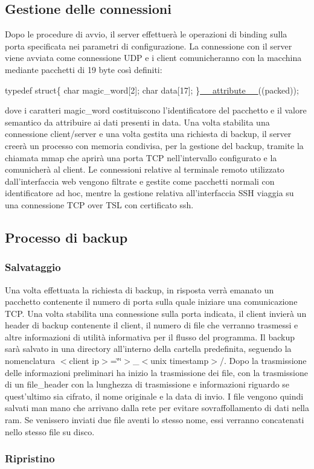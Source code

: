 \subsection*{Gestione delle connessioni}

Dopo le procedure di avvio, il server effettuerà le operazioni di binding sulla porta specificata nei parametri di configurazione. La connessione con il server viene avviata come connessione U\+DP e i client comunicheranno con la macchina mediante pacchetti di 19 byte così definiti\+:


\begin{DoxyCode}
\textcolor{keyword}{typedef} \textcolor{keyword}{struct}\{
\textcolor{keywordtype}{char} magic\_word[2];
\textcolor{keywordtype}{char} data[17];
\}\hyperlink{struct____attribute____}{\_\_attribute\_\_}((packed));
\end{DoxyCode}


dove i caratteri magic\+\_\+word costituiscono l’identificatore del pacchetto e il valore semantico da attribuire ai dati presenti in data. Una volta stabilita una connessione client/server e una volta gestita una richiesta di backup, il server creerà un processo con memoria condivisa, per la gestione del backup, tramite la chiamata mmap che aprirà una porta T\+CP nell’intervallo configurato e la comunicherà al client. Le connessioni relative al terminale remoto utilizzato dall’interfaccia web vengono filtrate e gestite come pacchetti normali con identificatore ad hoc, mentre la gestione relativa all’interfaccia S\+SH viaggia su una connessione T\+CP over T\+SL con certificato ssh. \subsection*{Processo di backup}

\subsubsection*{Salvataggio}

Una volta effettuata la richiesta di backup, in risposta verrà emanato un pacchetto contenente il numero di porta sulla quale iniziare una comunicazione T\+CP. Una volta stabilita una connessione sulla porta indicata, il client invierà un header di backup contenente il client, il numero di file che verranno trasmessi e altre informazioni di utilità informativa per il flusso del programma. Il backup sarà salvato in una directory all’interno della cartella predefinita, seguendo la nomenclatura $<$client ip$>$=\char`\"{}\char`\"{}$>$\+\_\+$<$unix timestamp$>$/. Dopo la trasmissione delle informazioni preliminari ha inizio la trasmissione dei file, con la trasmissione di un file\+\_\+header con la lunghezza di trasmissione e informazioni riguardo se quest’ultimo sia cifrato, il nome originale e la data di invio. I file vengono quindi salvati man mano che arrivano dalla rete per evitare sovraffollamento di dati nella ram. Se venissero inviati due file aventi lo stesso nome, essi verranno concatenati nello stesso file su disco. \subsubsection*{Ripristino}

